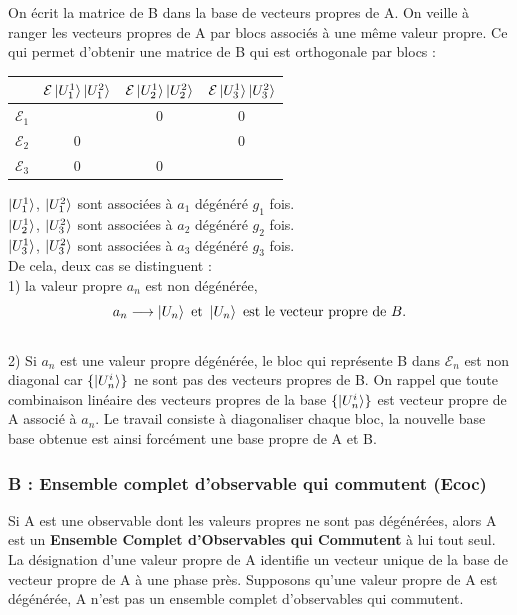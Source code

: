 \documentclass[12pt,a4paper,titlepage]{book}
\begin{document}
On écrit la matrice de B dans la base de vecteurs propres de A. On veille à ranger les vecteurs propres de A par blocs associés à une même valeur propre. Ce qui permet d'obtenir une matrice de B qui est orthogonale par blocs :\\

\begin{table}[h!]
\begin{center}
\label{tab:tableau 1}
\begin{tabular}{c|c|c|c}
 & $\mathcal{E} \ket{U_1^1} \ket{U_1^2}$ & $\mathcal{E} \ket{U_2^1} \ket{U_2^2}$ & $\mathcal{E} \ket{U_3^1} \ket{U_3^2}$\\
 \hline
$\mathcal{E}_1$ & & 0 & 0\\
\hline
$\mathcal{E}_2$ & 0 & & 0\\
\hline
$\mathcal{E}_3$ & 0 & 0 & \\
\end{tabular}
\end{center}
\end{table}
$\ket{U_1^1}$, $\ket{U_1^2}$ sont associées à $a_1$ dégénéré $g_1$ fois.\\
$\ket{U_2^1}$, $\ket{U_3^2}$ sont associées à $a_2$ dégénéré $g_2$ fois.\\
$\ket{U_3^1}$, $\ket{U_3^2}$ sont associées à $a_3$ dégénéré $g_3$ fois.\\

De cela, deux cas se distinguent :\\
1) la valeur propre $a_n$ est non dégénérée,
\begin{equation*}
a_n \longrightarrow \ket{U_n} ~\text{et}~ \ket{U_n} \text{ est le vecteur propre de }B.
\end{equation*}\\
2) Si $a_n$ est une valeur propre dégénérée, le bloc qui représente B dans $\mathcal{E}_n$ est non diagonal car $\lbrace \ket{U_n^i} \rbrace$ ne sont pas des vecteurs propres de B. On rappel que toute combinaison linéaire des vecteurs propres de la base $\lbrace \ket{U_n^i} \rbrace$ est vecteur propre de A associé à $a_n$. Le travail consiste à diagonaliser chaque bloc, la nouvelle base base obtenue est ainsi forcément une base propre de A et B.

\subsubsection{B : Ensemble complet d'observable qui commutent (Ecoc)}
Si A est une observable dont les valeurs propres ne sont pas dégénérées, alors A est un \textbf{Ensemble Complet d'Observables qui Commutent} à lui tout seul. La désignation d'une valeur propre de A identifie un vecteur unique de la base de vecteur propre de A à une phase près. Supposons qu'une valeur propre de A est dégénérée, A n'est pas un ensemble complet d'observables qui commutent.\\
\end{document}
